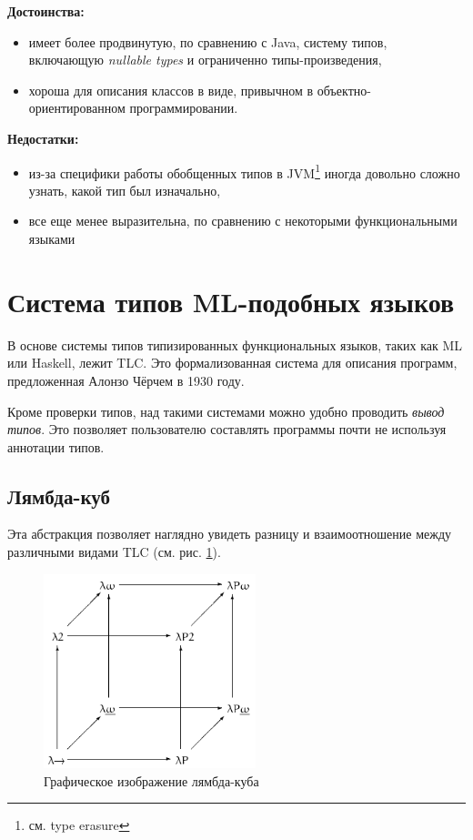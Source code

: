 \textbf{Достоинства:}
\begin{itemize}
    \item имеет более продвинутую, по сравнению с Java, систему типов, включающую \textit{nullable types} и ограниченно типы-произведения,
    \item хороша для описания классов в виде, привычном в объектно-ориентированном программировании.
\end{itemize}

\textbf{Недостатки:}
\begin{itemize}
    \item из-за специфики работы обобщенных типов в JVM\footnote{см. type erasure} иногда довольно сложно узнать, какой тип был изначально,
    \item все еще менее выразительна, по сравнению с некоторыми функциональными языками
\end{itemize}

\section{Система типов ML-подобных языков}
\label{sec:ml_type_system}

В основе системы типов типизированных функциональных языков, таких как ML или Haskell, лежит \gls{TLC}.
Это формализованная система для описания программ, предложенная Алонзо Чёрчем в 1930 году.

Кроме проверки типов, над такими системами можно удобно проводить \textit{вывод типов}.
Это позволяет пользователю составлять программы почти не используя аннотации типов.

\subsection{Лямбда-куб}
\label{subsec:lambda_cube}

Эта абстракция позволяет наглядно увидеть разницу и взаимоотношение между различными видами \gls{TLC} (см. рис. \ref{fig:lambda_cube}).

\begin{figure}[H]
    \centering
    \includegraphics[width=0.55\textwidth]{figures/Lambda_cube}
    \caption{Графическое изображение лямбда-куба}
    \label{fig:lambda_cube}
\end{figure}

